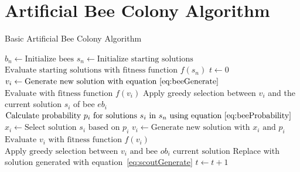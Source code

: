 \section{Artificial Bee Colony Algorithm}
\label{sec:BEE}
\begin{algorithm}
\caption{Basic Artificial Bee Colony Algorithm}
\label{alg:ABC}
	\begin{algorithmic}[1]
		\STATE$b_n \leftarrow \text{Initialize bees}$
		\STATE$s_n \leftarrow \text{Initialize starting solutions}$
		\STATE$\text{Evaluate starting solutions with fitness function $f(s_n)$}$
		\STATE$t \leftarrow 0$
				\STATE$v_i \leftarrow \text{Generate new solution with equation~\ref{eq:beeGenerate}}$
				\STATE$\text{Evaluate with fitness function $f(v_i)$}$
				\STATE Apply greedy selection between $v_i$ and the current solution $s_i$ of bee $eb_i$
			\ENDFOR
			\STATE$\text{Calculate probability $p_i$ for solutions $s_i$ in $s_n$ using equation~\ref{eq:beeProbability}}$
				\STATE$x_i \leftarrow \text{Select solution $s_i$ based on $p_i$} $
				\STATE$v_i \leftarrow \text{Generate new solution with $x_i$ and $p_i$}$
				\STATE$\text{Evaluate $v_i$ with fitness function $f(v_i)$}$
				\STATE$\text{Apply greedy selection between $v_i$ and bee $ob_i$ current solution}$
			\ENDFOR
				\STATE Replace with solution generated with equation~\ref{eq:scoutGenerate}
			\ENDIF
			\STATE$t \leftarrow t + 1$
		\ENDWHILE
	\end{algorithmic}
\end{algorithm}
